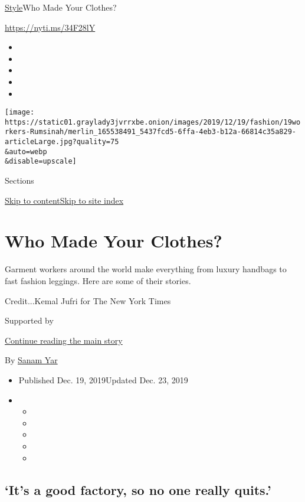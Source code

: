 \href{/section/style}{Style}\textbar{}Who Made Your Clothes?

\href{https://nyti.ms/34F28lY}{https://nyti.ms/34F28lY}

\begin{itemize}
\item
\item
\item
\item
\item
\end{itemize}

\texttt{[image: https://static01.graylady3jvrrxbe.onion/images/2019/12/19/fashion/19workers-Rumsinah/merlin\_165538491\_5437fcd5-6ffa-4eb3-b12a-66814c35a829-articleLarge.jpg?quality=75\\\&auto=webp\\\&disable=upscale]}

Sections

\protect\hyperlink{site-content}{Skip to
content}\protect\hyperlink{site-index}{Skip to site index}

\hypertarget{who-made-your-clothes}{%
\section{Who Made Your Clothes?}\label{who-made-your-clothes}}

Garment workers around the world make everything from luxury handbags to
fast fashion leggings. Here are some of their stories.

Credit...Kemal Jufri for The New York Times

Supported by

\protect\hyperlink{after-sponsor}{Continue reading the main story}

By \href{https://www.nytimes3xbfgragh.onion/by/sanam-yar}{Sanam Yar}

\begin{itemize}
\item
  Published Dec. 19, 2019Updated Dec. 23, 2019
\item
  \begin{itemize}
  \item
  \item
  \item
  \item
  \item
  \end{itemize}
\end{itemize}

\hypertarget{its-a-good-factory-so-no-one-really-quits}{%
\subsection{`It's a good factory, so no one really
quits.'}\label{its-a-good-factory-so-no-one-really-quits}}

